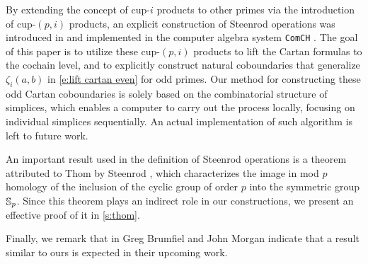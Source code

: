 By extending the concept of cup-$i$ products to other primes via the introduction of cup-$(p,i)$ products, an explicit construction of Steenrod operations was introduced in \cite{medina2021may_st} and implemented in the computer algebra system \texttt{ComCH} \cite{medina2021comch}.
The goal of this paper is to utilize these cup-$(p,i)$ products to lift the Cartan formulas to the cochain level, and to explicitly construct natural coboundaries that generalize $\zeta_i(a,b)$ in \cref{e:lift cartan even} for odd primes.
Our method for constructing these odd Cartan coboundaries is solely based on the combinatorial structure of simplices, which enables a computer to carry out the process locally, focusing on individual simplices sequentially.
An actual implementation of such algorithm is left to future work.

An important result used in the definition of Steenrod operations is a theorem attributed to Thom by Steenrod \cite[Thm.~4.6]{steenrod1953cyclic}, which characterizes the image in mod $p$ homology of the inclusion of the cyclic group of order $p$ into the symmetric group $\mathbb{S}_p$.
Since this theorem plays an indirect role in our constructions, we present an effective proof of it in \cref{s:thom}.

Finally, we remark that in \cite{brumfiel2023explicit} Greg Brumfiel and John Morgan indicate that a result similar to ours is expected in their upcoming work.